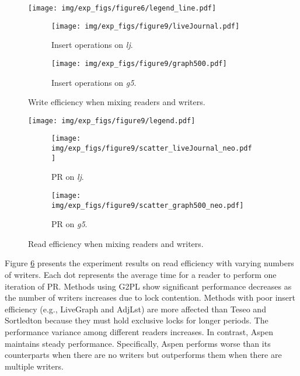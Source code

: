 \begin{figure}[h!]
    \setlength{\abovecaptionskip}{0pt}
    \setlength{\belowcaptionskip}{0pt}
    \captionsetup[subfigure]{aboveskip=0pt,belowskip=0pt}
    \centering
    \texttt{[image: img/exp\_figs/figure6/legend\_line.pdf]}\\
    \begin{subfigure}[t]{0.30\textwidth}
        \centering
        \texttt{[image: img/exp\_figs/figure9/liveJournal.pdf]}
        \caption{Insert operations on \emph{lj}.}
        \label{fig:concurrency_insert_lj}
    \end{subfigure}
    \begin{subfigure}[t]{0.30\textwidth}
        \centering
        \texttt{[image: img/exp\_figs/figure9/graph500.pdf]}
        \caption{Insert operations on \emph{g5}.}
        \label{fig:concurrency_insert_g5}
    \end{subfigure}
    \caption{Write efficiency when mixing readers and writers.}
    \label{fig:concurrency_write}
\end{figure}


\begin{figure}[h!]
    \setlength{\abovecaptionskip}{0pt}
    \setlength{\belowcaptionskip}{0pt}
    \captionsetup[subfigure]{aboveskip=0pt,belowskip=0pt}
    \centering
     \texttt{[image: img/exp\_figs/figure9/legend.pdf]}\\
    \begin{subfigure}[t]{0.30\textwidth}
        \centering
        \texttt{[image: img/exp\_figs/figure9/scatter\_liveJournal\_neo.pdf]}
        \caption{PR on \emph{lj}.}
        \label{fig:concurrency_pr_lj}
    \end{subfigure}
    \begin{subfigure}[t]{0.30\textwidth}
        \centering
        \texttt{[image: img/exp\_figs/figure9/scatter\_graph500\_neo.pdf]}
        \caption{PR on \emph{g5}.}
        \label{fig:concurrency_pr_g5}
    \end{subfigure}
   
    \caption{Read efficiency when mixing readers and writers.}
    \label{fig:concurrency_pr}
\end{figure}


Figure \ref{fig:concurrency_pr} presents the experiment results on read efficiency with varying numbers of writers. Each dot represents the average time for a reader to perform one iteration of PR. Methods using G2PL show significant performance decreases as the number of writers increases due to lock contention. Methods with poor insert efficiency (e.g., LiveGraph and AdjLst) are more affected than Teseo and Sortledton because they must hold exclusive locks for longer periods. The performance variance among different readers increases. In contrast, Aspen maintains steady performance. Specifically, Aspen performs worse than its counterparts when there are no writers but outperforms them when there are multiple writers.

